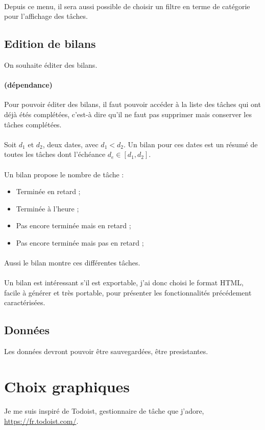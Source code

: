 \documentclass{article}
\begin{document}
		\paragraph{}
		Depuis ce menu, il sera aussi possible de choisir un filtre en terme de catégorie pour l'affichage des tâches.
	\subsection{Edition de bilans}
		On souhaite éditer des bilans.
		\paragraph{(dépendance)} Pour pouvoir éditer des bilans, il faut pouvoir accéder à la liste des tâches qui ont déjà étés complétées, c'est-à dire qu'il ne faut pas supprimer mais conserver les tâches complétées.
		\paragraph{}
		Soit $d_1$ et $d_2$, deux dates, avec $d_1<d_2$. Un bilan pour ces dates est un résumé de toutes les tâches dont l'échéance $d_e\in [d_1, d_2]$.
		\paragraph{}
		Un bilan propose le nombre de tâche :
		\begin{itemize}
			\item Terminée en retard ;
			\item Terminée à l'heure ;
			\item Pas encore terminée mais en retard ;
			\item Pas encore terminée mais pas en retard ;
		\end{itemize}
		\paragraph{}
		Aussi le bilan montre ces différentes tâches.
		\paragraph{}
		Un bilan est intéressant s'il est exportable, j'ai donc choisi le format HTML, facile à générer et très portable, pour présenter les fonctionnalités précédement caractérisées. 
	\subsection{Données}
		Les données devront pouvoir être sauvegardées, être presistantes.
\section{Choix graphiques}
	Je me suis inspiré de Todoist, gestionnaire de tâche que j'adore, \url{https://fr.todoist.com/}.
\end{document}
